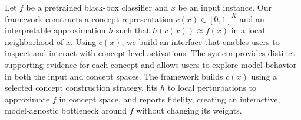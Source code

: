 \documentclass[sigconf,review,screen]{acmart}
\begin{document}

Let $f$ be a pretrained black-box classifier and $x$ be an input instance. Our framework constructs a concept representation $c(x)\in[0,1]^K$ and an interpretable approximation $h$ such that $h(c(x)) \approx f(x)$ in a local neighborhood of $x$. 
Using $c(x)$, we build an interface that enables users to inspect and interact with concept-level activations. 
The system provides distinct supporting evidence for each concept and allows users to explore model behavior in both the input and concept spaces.
% 
The framework builds $c(x)$ using a selected concept construction strategy, fits $h$ to local perturbations to approximate $f$ in concept space, and reports fidelity, creating an interactive, model-agnostic bottleneck around $f$ without changing its weights.



\end{document}
